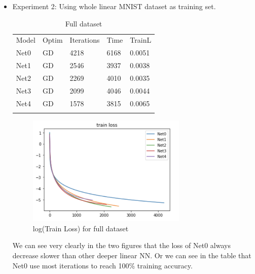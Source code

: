\begin{enumerate}
\begin{itemize}
	
	
	
		\item Experiment 2: Using whole linear MNIST dataset as training set.
		\begin{table}[H]
			\centering
			\caption{Full dataset}
			\label{tab:2}      
			\begin{tabular}{lllll}
				\hline\noalign{\smallskip}
				Model &  Optim & Iterations & Time  & TrainL \\
				\noalign{\smallskip}\hline\noalign{\smallskip}
				
				Net0 & GD & 4218 & 6168 & 0.0051  \\
				
				Net1 & GD & 2546 & 3937 & 0.0038  \\
				
				Net2 & GD & 2269 & 4010 & 0.0035  \\
				
				Net3 & GD & 2099 & 4046 & 0.0044  \\
				
				Net4 & GD & 1578 & 3815 &0.0065  \\
				
				\noalign{\smallskip}\hline
				
			\end{tabular}
		\end{table}
		
		
		\begin{figure}[H]
			\centering
			\includegraphics[width=3in]{figure/logGDfullL.png}   
			\caption{log(Train Loss) for full dataset}
		\end{figure}
		We can see very clearly in the two figures that the loss of Net0 always decrease slower than other deeper linear NN. Or we can see in the table that Net0 use most iterations to reach 100\% training accuracy. 
	

\end{itemize}
\end{enumerate}
